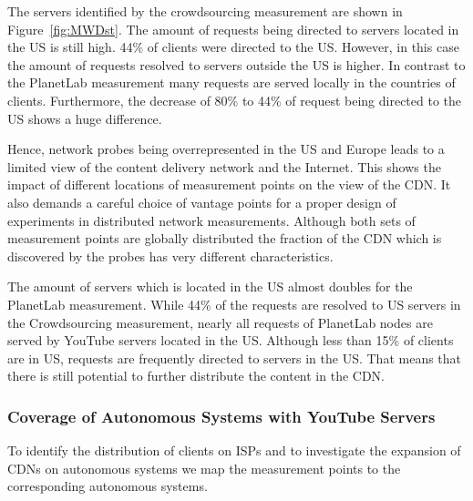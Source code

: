 
The servers identified by the crowdsourcing measurement are shown in Figure~\ref{fig:MWDst}.
The amount of requests being directed to servers located in the US is still high.
44\% of clients were directed to the US.
However, in this case the amount of requests resolved to servers outside the US is higher.
In contrast to the PlanetLab measurement many requests are served  locally in the countries of clients.
Furthermore, the decrease of 80\% to 44\% of request being directed to the US shows a huge difference.


Hence, network probes being overrepresented in the US and Europe leads to a limited  view of the content delivery network and the Internet.
This shows the impact of different locations of measurement points on the view of the CDN.
It also demands a careful choice of vantage points for a proper design of experiments in distributed network measurements.
Although both sets of measurement points are globally distributed the fraction of the CDN which is discovered by the probes has very different characteristics.

The amount of servers which is located in the US almost doubles for the PlanetLab measurement.
While 44\% of the requests are resolved to US servers in the Crowdsourcing measurement, nearly all requests of PlanetLab nodes are served by YouTube servers located in the US.
Although less than 15\% of clients are in US, requests are frequently directed to servers in the US. That means that there is still potential to further distribute the content in the CDN.

\subsubsection{Coverage of Autonomous Systems with YouTube Servers}

To identify the distribution of clients on ISPs  and to investigate the expansion of CDNs on autonomous systems we map the measurement points to the corresponding autonomous systems.

